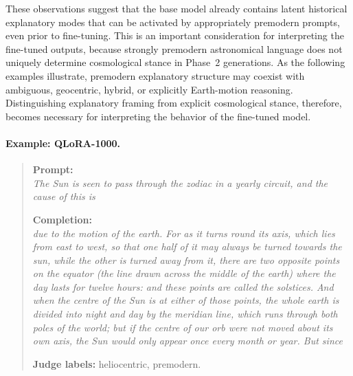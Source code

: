 These observations suggest that the base model already contains latent historical explanatory modes that can be activated by appropriately premodern prompts, even prior to fine-tuning. This is an important consideration for interpreting the fine-tuned outputs, because strongly premodern astronomical language does not uniquely determine cosmological stance in Phase~2 generations. As the following examples illustrate, premodern explanatory structure may coexist with ambiguous, geocentric, hybrid, or explicitly Earth-motion reasoning. Distinguishing explanatory framing from explicit cosmological stance, therefore, becomes necessary for interpreting the behavior of the fine-tuned model.


\paragraph{Example: QLoRA-1000.}
\begin{quote}
\textbf{Prompt:} \\
\textit{The Sun is seen to pass through the zodiac in a yearly circuit, and the cause of this is}

\vspace{0.5em}

\textbf{Completion:} \\
\textit{due to the motion of the earth. For as it turns round its axis, which lies from east to west, so that one half of it may always be turned towards the sun, while the other is turned away from it, there are two opposite points on the equator (the line drawn across the middle of the earth) where the day lasts for twelve hours: and these points are called the solstices. And when the centre of the Sun is at either of those points, the whole earth is divided into night and day by the meridian line, which runs through both poles of the world; but if the centre of our orb were not moved about its own axis, the Sun would only appear once every month or year. But since}
\vspace{0.5em}

\textbf{Judge labels:} heliocentric, premodern.
\end{quote}


